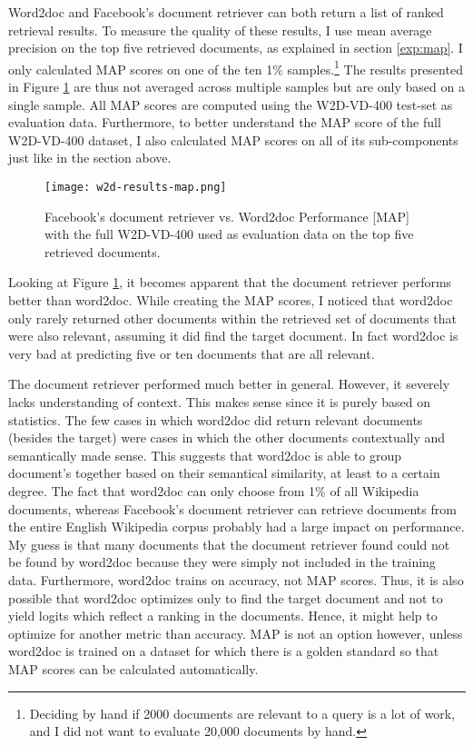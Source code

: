 Word2doc and Facebook's document retriever can both return a list of ranked retrieval results. To measure the quality of these
results, I use mean average precision on the top five retrieved documents, as explained in section \ref{exp:map}. I only calculated
MAP scores on one of the ten 1\% samples.\footnote{Deciding by hand if 2000 documents are relevant to a query is a lot of work, and I did not
want to evaluate 20,000 documents by hand.} The
results presented in Figure \ref{fig:w2d-results-map} are thus not averaged across multiple samples but are only based on a single
sample. All MAP scores are computed using the W2D-VD-400 test-set as evaluation data. Furthermore, to better understand the MAP
score of the full W2D-VD-400 dataset, I also calculated MAP scores on all of its sub-components just like in the section above.

\begin{figure}
  \begin{center}
    \texttt{[image: w2d-results-map.png]}
  \end{center}
  \captionsetup{width=.75\linewidth}
  \caption{Facebook's document retriever vs. Word2doc Performance [MAP] with the full W2D-VD-400 used as evaluation data on the
  top five retrieved documents.}
  \label{fig:w2d-results-map}
\end{figure}

Looking at Figure \ref{fig:w2d-results-map}, it becomes apparent that the document retriever performs better than word2doc. While
creating the MAP scores, I noticed that word2doc only rarely returned other documents within the retrieved set of documents that were also
relevant, assuming it did find the target document. In fact word2doc is very bad at predicting five or ten documents
that are all relevant.

The document retriever performed much better in general. However, it severely lacks understanding of context.
This makes sense since it is purely based on statistics. The few cases in which word2doc did return relevant documents (besides
the target) were cases in which the other documents contextually and semantically made sense. This suggests that word2doc is able
to group document's together based on their semantical similarity, at least to a certain degree. The fact that word2doc can only
choose from 1\% of all Wikipedia documents, whereas Facebook's document retriever can retrieve documents from the entire
English Wikipedia corpus probably had a large impact on performance. My guess is that many documents that the document retriever
found could not be found by
word2doc because they were simply not included in the training data. Furthermore, word2doc trains on accuracy, not MAP scores.
Thus, it is also possible that word2doc optimizes only to find the target document and not to yield logits which reflect a ranking
in the documents. Hence, it might help to optimize for another metric than accuracy. MAP is not an option however, unless word2doc is
trained on a dataset for which there is a golden standard so that MAP scores can be calculated automatically.


